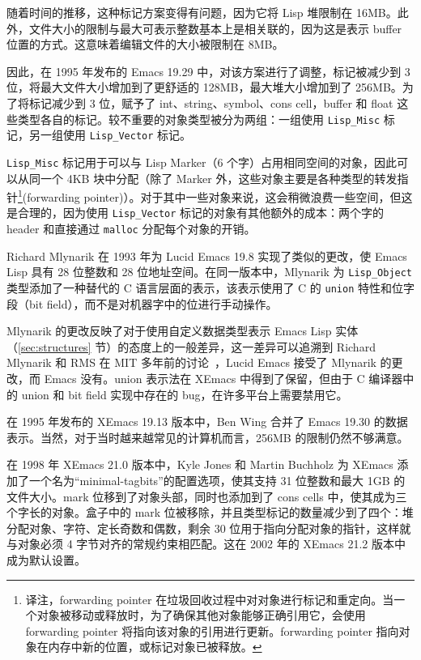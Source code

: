 \documentclass[format=acmsmall,screen]{acmart}
\begin{document}
随着时间的推移，这种标记方案变得有问题，因为它将 Lisp 堆限制在 16MB。此外，文件大小的限制与最大可表示整数基本上是相关联的，因为这是表示 buffer 位置的方式。这意味着编辑文件的大小被限制在 8MB。

因此，在 1995 年发布的 Emacs 19.29 中，对该方案进行了调整，标记被减少到 3 位，将最大文件大小增加到了更舒适的 128MB，最大堆大小增加到了 256MB。为了将标记减少到 3 位，赋予了 int、string、symbol、cons cell，buffer 和 float 这些类型各自的标记。较不重要的对象类型被分为两组：一组使用 \texttt{Lisp\_Misc} 标记，另一组使用 \texttt{Lisp\_Vector} 标记。

\texttt{Lisp\_Misc} 标记用于可以与 Lisp Marker（6 个字）占用相同空间的对象，因此可以从同一个 4KB 块中分配（除了 Marker 外，这些对象主要是各种类型的转发指针\footnote{译注，forwarding pointer 在垃圾回收过程中对对象进行标记和重定向。当一个对象被移动或释放时，为了确保其他对象能够正确引用它，会使用 forwarding pointer 将指向该对象的引用进行更新。forwarding pointer 指向对象在内存中新的位置，或标记对象已被释放。}(forwarding pointer)）。对于其中一些对象来说，这会稍微浪费一些空间，但这是合理的，因为使用 \texttt{Lisp\_Vector} 标记的对象有其他额外的成本：两个字的 header 和直接通过 \texttt{malloc} 分配每个对象的开销。

Richard Mlynarik 在 1993 年为 Lucid Emacs 19.8 实现了类似的更改，使 Emacs Lisp 具有 28 位整数和 28 位地址空间。在同一版本中，Mlynarik 为 \texttt{Lisp\_Object} 类型添加了一种替代的 C 语言层面的表示，该表示使用了 C 的 \texttt{union} 特性和位字段（bit field），而不是对机器字中的位进行手动操作。

Mlynarik 的更改反映了对于使用自定义数据类型表示 Emacs Lisp 实体（\ref{sec:structures} 节）的态度上的一般差异，这一差异可以追溯到 Richard Mlynarik 和 RMS 在 MIT 多年前的讨论~\cite{Mlynarik-personal}，Lucid Emacs 接受了 Mlynarik 的更改，而 Emacs 没有。union 表示法在 XEmacs 中得到了保留，但由于 C 编译器中的 union 和 bit field 实现中存在的 bug，在许多平台上需要禁用它。

在 1995 年发布的 XEmacs 19.13 版本中，Ben Wing 合并了 Emacs 19.30 的数据表示。当然，对于当时越来越常见的计算机而言，256MB 的限制仍然不够满意。

在 1998 年 XEmacs 21.0 版本中，Kyle Jones 和 Martin Buchholz 为 XEmacs 添加了一个名为“minimal-tagbits”的配置选项，使其支持 31 位整数和最大 1GB 的文件大小。mark 位移到了对象头部，同时也添加到了 cons cells 中，使其成为三个字长的对象。盒子中的 mark 位被移除，并且类型标记的数量减少到了四个：堆分配对象、字符、定长奇数和偶数，剩余 30 位用于指向分配对象的指针，这样就与对象必须 4 字节对齐的常规约束相匹配。这在 2002 年的 XEmacs 21.2 版本中成为默认设置。
\end{document}
